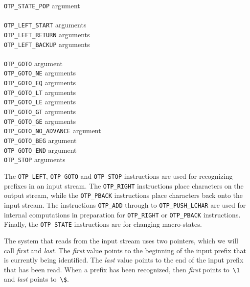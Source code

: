 \documentclass[fleqn]{article}
\begin{document}
\begin{tabbing}
 \> \quad \verb|OTP_STATE_POP| \>  argument\\
\\
 \> \quad \verb|OTP_LEFT_START| \>  arguments\\
 \> \quad \verb|OTP_LEFT_RETURN| \>  arguments\\
 \> \quad \verb|OTP_LEFT_BACKUP| \>  arguments\\
\\
 \> \quad \verb|OTP_GOTO| \>  argument\\
 \> \quad \verb|OTP_GOTO_NE| \>  arguments\\
 \> \quad \verb|OTP_GOTO_EQ| \>  arguments\\
 \> \quad \verb|OTP_GOTO_LT| \>  arguments\\
 \> \quad \verb|OTP_GOTO_LE| \>  arguments\\
 \> \quad \verb|OTP_GOTO_GT| \>  arguments\\
 \> \quad \verb|OTP_GOTO_GE| \>  arguments\\
 \> \quad \verb|OTP_GOTO_NO_ADVANCE| \>  argument\\
 \> \quad \verb|OTP_GOTO_BEG| \>  argument\\
 \> \quad \verb|OTP_GOTO_END| \>  argument\\
 \> \quad \verb|OTP_STOP| \>  arguments\\
\end{tabbing}

The \verb|OTP_LEFT|, \verb|OTP_GOTO| and \verb|OTP_STOP| instructions
are used for recognizing prefixes in an input stream.  The \verb|OTP_RIGHT|
instructions place characters on the output stream, while the
\verb|OTP_PBACK| instructions place characters back onto the input
stream.  The instructions \verb|OTP_ADD| through to
\verb|OTP_PUSH_LCHAR| are used for internal computations in preparation
for \verb|OTP_RIGHT| or \verb|OTP_PBACK| instructions.  Finally, the
\verb|OTP_STATE| instructions are for changing macro-states.

The system that reads from the input stream uses two pointers, which
we will call \emph{first} and \emph{last}. The \emph{first} value
points to the beginning of the input prefix that is currently being
identified.  The \emph{last} value points to the end of the input
prefix that has been read.  When a prefix has been recognized, then
\emph{first} points to~\verb|\1| and \emph{last} points to~\verb|\$|.
\end{document}
